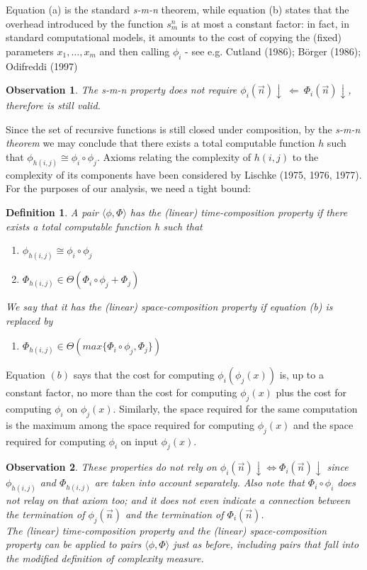 \documentclass[10pt, a4paper, oneside, titlepage, draft]{article}
\newtheorem{definition}[shrd]{Definition}
\newtheorem{observation}{Observation}[shrd]
\begin{document}
Equation (a) is the standard \emph{s-m-n} theorem, while equation (b) states that the overhead introduced by the function $s_m^n$ is at most a constant factor: in fact, in standard computational models, it amounts to the cost of copying the (fixed) parameters $x_1,\dots,x_m$ and then calling $\phi_i$ - see e.g. Cutland (1986); Börger (1986); Odifreddi (1997)

\begin{observation}
    The s-m-n property does not require $\phi_i(\vec{n})\downarrow \ \Leftarrow \ \Phi_i(\vec{n})\downarrow$, therefore is still valid.
\end{observation}

Since the set of recursive functions is still closed under composition, by the \emph{s-m-n theorem} we may conclude that there exists a total computable function $h$ such that $\phi_{h(i,j)} \cong \phi_i \circ \phi_j $. Axioms relating the complexity of $h(i,j)$ to the complexity of its components have been considered by Lischke (1975, 1976, 1977). For the purposes of our analysis, we need a tight bound:

\begin{definition}
    A pair $\langle \phi, \Phi \rangle$ has the (linear) time-composition property if there exists a total computable function h such that 
    \begin{enumerate}[label=(\alph*)]
        \item $ \phi_{h(i,j)} \cong \phi_i \circ \phi_j $
        \item $ \Phi_{h(i,j)} \in \Theta(\Phi_i \circ \phi_j + \Phi_j) $
    \end{enumerate}
    We say that it has the (linear) space-composition property if equation (b) is replaced by
    \begin{enumerate}[label=(c)]
        \item $ \Phi_{h(i,j)} \in \Theta(max \{ \Phi_i \circ \phi_j, \Phi_j \}) $
    \end{enumerate}
\end{definition}

\noindent Equation $(b)$ says that the cost for computing $\phi_i(\phi_j(x))$ is, up to a constant factor, no more than the cost for computing $\phi_j(x)$ plus the cost for computing $\phi_i$ on $\phi_j(x)$. Similarly, the space required for the same computation is the maximum among the space required for computing $\phi_j(x)$ and the space required for computing $\phi_i$ on input $\phi_j(x)$. 

\begin{observation}
    These properties do not rely on $\phi_i(\vec{n})\downarrow \iff \Phi_i(\vec{n})\downarrow$ since $\phi_{h(i,j)}$ and $\Phi_{h(i,j)}$ are taken into account separately. Also note that $\Phi_i \circ \phi_i$ does not relay on that axiom too; and it does not even indicate a connection between the termination of $\phi_j(\vec{n})$ and the termination of $\Phi_i(\vec{n})$.
    \\ The (linear) time-composition property and the (linear) space-composition property can be applied to pairs $\langle \phi, \Phi \rangle$ just as before, including pairs that fall into the modified definition of complexity measure.
\end{observation}
\end{document}

